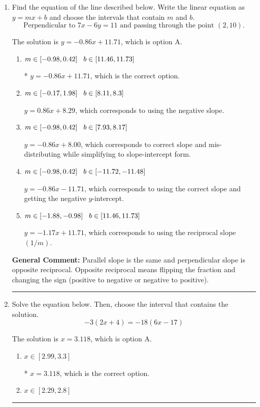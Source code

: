 \documentclass{extbook}[14pt]
\newcommand{\litem}[1]{\item #1

\rule{\textwidth}{0.4pt}}
\begin{document}
\begin{enumerate}\litem{
Find the equation of the line described below. Write the linear equation as $ y=mx+b $ and choose the intervals that contain $m$ and $b$.
\[ \text{Perpendicular to } 7 x - 6 y = 11 \text{ and passing through the point } (2, 10). \]

The solution is \( y = -0.86x + 11.71 \), which is option A.\begin{enumerate}[label=\Alph*.]
\item \( m \in [-0.98, 0.42] \hspace*{3mm} b \in [11.46, 11.73] \)

* $y = -0.86x + 11.71$, which is the correct option.
\item \( m \in [-0.17, 1.98] \hspace*{3mm} b \in [8.11, 8.3] \)

 $y = 0.86x + 8.29$, which corresponds to using the negative slope.
\item \( m \in [-0.98, 0.42] \hspace*{3mm} b \in [7.93, 8.17] \)

 $y = -0.86x + 8.00$, which corresponds to correct slope and mis-distributing while simplifying to slope-intercept form.
\item \( m \in [-0.98, 0.42] \hspace*{3mm} b \in [-11.72, -11.48] \)

 $y = -0.86x - 11.71$, which corresponds to using the correct slope and getting the negative $y$-intercept.
\item \( m \in [-1.88, -0.98] \hspace*{3mm} b \in [11.46, 11.73] \)

 $y = -1.17x + 11.71$, which corresponds to using the reciprocal slope $(1/m)$.
\end{enumerate}

\textbf{General Comment:} Parallel slope is the same and perpendicular slope is opposite reciprocal. Opposite reciprocal means flipping the fraction and changing the sign (positive to negative or negative to positive).
}
\litem{
Solve the equation below. Then, choose the interval that contains the solution.
\[ -3(2x + 4) = -18(6x -17) \]

The solution is \( x = 3.118 \), which is option A.\begin{enumerate}[label=\Alph*.]
\item \( x \in [2.99, 3.3] \)

* $x = 3.118$, which is the correct option.
\item \( x \in [2.29, 2.8] \)


\end{enumerate}}
\end{enumerate}
\end{document}
